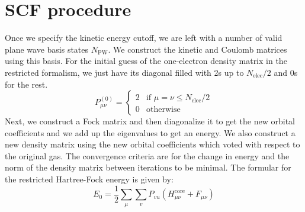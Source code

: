 \documentclass[12pt]{article}
\begin{document}
\section{SCF procedure}
Once we specify the kinetic energy cutoff, we are left with a number of valid plane wave basis states $N_{\text{PW}}$. We construct the kinetic and Coulomb matrices using this basis. For the initial guess of the one-electron density matrix in the restricted formalism, we just have its diagonal filled with 2s up to $N_\text{elec}/2$ and 0s for the rest.
\begin{equation}
    P^{(0)}_{\mu\nu} = \begin{cases}
    2 & \text{if } \mu = \nu \leq N_\text{elec}/2 \\
    0 & \text{otherwise}
    \end{cases}
\end{equation}
Next, we construct a Fock matrix and then diagonalize it to get the new orbital coefficients and we add up the eigenvalues to get an energy. We also construct a new density matrix using the new orbital coefficients which voted with respect to the original gas. The convergence criteria are for the change in energy and the norm of the density matrix between iterations to be minimal.
The formular for the restricted Hartree-Fock energy is given by:
\begin{equation}
    E_0=\frac{1}{2} \sum_\mu \sum_v P_{v u}\left(H_{\mu \nu}^{\mathrm{core}}+F_{\mu \nu}\right)
\end{equation}
\end{document}
